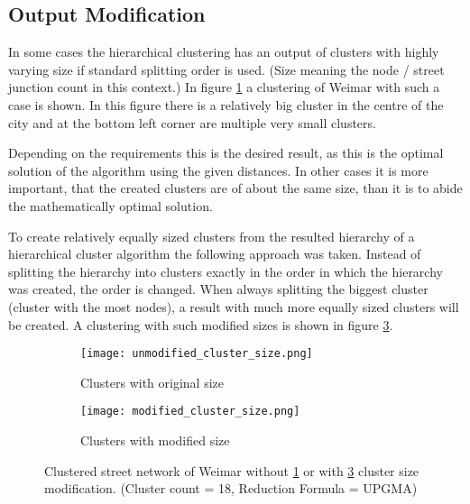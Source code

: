 \subsection{Output Modification} \label{sec:outout_modification}
In some cases the hierarchical clustering has an output of clusters with highly varying size if standard splitting order is used. (Size meaning the node / street junction count in this context.) In figure \ref{fig:unmodified_cluster_size} a clustering of Weimar with such a case is shown. In this figure there is a relatively big cluster in the centre of the city and at the bottom left corner are multiple very small clusters.

Depending on the requirements this is the desired result, as this is the optimal solution of the algorithm using the given distances. In other cases it is more important, that the created clusters are of about the same size, than it is to abide the mathematically optimal solution.

To create relatively equally sized clusters from the resulted hierarchy of a hierarchical cluster algorithm the following approach was taken. Instead of splitting the hierarchy into clusters exactly in the order in which the hierarchy was created, the order is changed. When always splitting the biggest cluster (cluster with the most nodes), a result with much more equally sized clusters will be created. A clustering with such modified sizes is shown in figure \ref{fig:modified_cluster_size}.

\begin{figure}
    \centering
    \begin{subfigure}[b]{0.49\textwidth}
        \begin{mdframed}[style=mdthight, userdefinedwidth=0.9\linewidth]
            \texttt{[image: unmodified\_cluster\_size.png]}
        \end{mdframed}
        \caption{Clusters with original size}
        \label{fig:unmodified_cluster_size}
    \end{subfigure}
    \begin{subfigure}[b]{0.49\textwidth}
        \begin{mdframed}[style=mdthight, userdefinedwidth=0.9\linewidth]
            \texttt{[image: modified\_cluster\_size.png]}
        \end{mdframed}
        \caption{Clusters with modified size}
        \label{fig:modified_cluster_size}
    \end{subfigure}
    \caption{Clustered street network of Weimar without \ref{fig:unmodified_cluster_size} or with \ref{fig:modified_cluster_size} cluster size modification. (Cluster count = 18, Reduction Formula = \acrshort{UPGMA})}
\end{figure}
